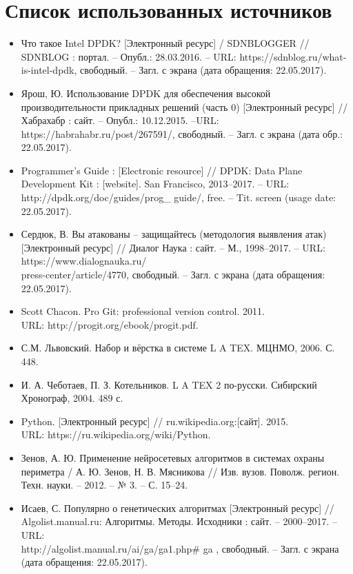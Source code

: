 \section*{Список использованных источников}


\begin{itemize}
\item Что такое Intel DPDK? [Электронный ресурс] / SDNBLOGGER // SDNBLOG : портал. – Опубл.: 28.03.2016. – URL: https://sdnblog.ru/what-is-intel-dpdk, свободный. – Загл. с экрана (дата обращения: 22.05.2017).
\item Ярош, Ю. Использование DPDK для обеспечения высокой производительности прикладных решений (часть 0) [Электронный ресурс] // Хабрахабр : сайт. – Опубл.: 10.12.2015. –URL: https://habrahabr.ru/post/267591/, свободный. – Загл. с экрана (дата обр.: 22.05.2017).
\item Programmer's Guide : [Electronic resource] // DPDK: Data Plane Development Kit : [website]. San Francisco, 2013–2017. – URL: http://dpdk.org/doc/guides/prog\_ guide/, free. – Tit. screen (usage date: 22.05.2017). 
\item Сердюк, В. Вы атакованы – защищайтесь (методология выявления атак) [Электронный ресурс] // Диалог Наука : сайт. – М., 1998–2017. – URL: https://www.dialognauka.ru/ \\press-center/article/4770, свободный. – Загл. с экрана (дата обращения: 22.05.2017). 
\item Scott Chacon. Pro Git: professional version control. 2011. \\ URL: http://progit.org/ebook/progit.pdf.
\item С.М. Львовский. Набор и вёрстка в системе L A TEX. МЦНМО, 2006. С. 448.
\item И. А. Чеботаев, П. З. Котельников. L A TEX 2 по-русски. Сибирский Хронограф, 2004. 489 с.
\item  Python. [Электронный ресурс] // ru.wikipedia.org:[сайт]. 2015.\\ URL: https://ru.wikipedia.org/wiki/Python.
\item Зенов, А. Ю. Применение нейросетевых алгоритмов в системах охраны периметра / А. Ю. Зенов, Н. В. Мясникова // Изв. вузов. Поволж. регион. Техн. науки. – 2012. – № 3. – С. 15–24.
\item Исаев, С. Популярно о генетических алгоритмах [Электронный ресурс] // \\ Algolist.manual.ru: Алгоритмы. Методы. Исходники : сайт. – 2000–2017. – URL: \\http://algolist.manual.ru/ai/ga/ga1.php\# ga , свободный. – Загл. с экрана (дата обращения: 22.05.2017).

\end{itemize}
